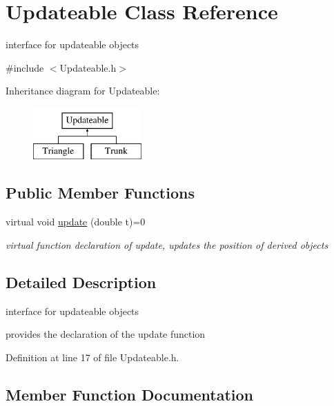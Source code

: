 \hypertarget{class_updateable}{}\section{Updateable Class Reference}
\label{class_updateable}


interface for updateable objects  




{\ttfamily \#include $<$Updateable.\+h$>$}

Inheritance diagram for Updateable\+:\begin{figure}[H]
\begin{center}
\leavevmode
\includegraphics[height=2.000000cm]{class_updateable}
\end{center}
\end{figure}
\subsection*{Public Member Functions}
\begin{DoxyCompactItemize}
\item 
virtual void \mbox{\hyperlink{class_updateable_aedd932b85972fac4f78d4612ff7468c1}{update}} (double t)=0
\begin{DoxyCompactList}\small\item\em virtual function declaration of update, updates the position of derived objects \end{DoxyCompactList}\end{DoxyCompactItemize}


\subsection{Detailed Description}
interface for updateable objects 

provides the declaration of the update function 

Definition at line 17 of file Updateable.\+h.



\subsection{Member Function Documentation}
\mbox{\label{class_updateable_aedd932b85972fac4f78d4612ff7468c1}} 
